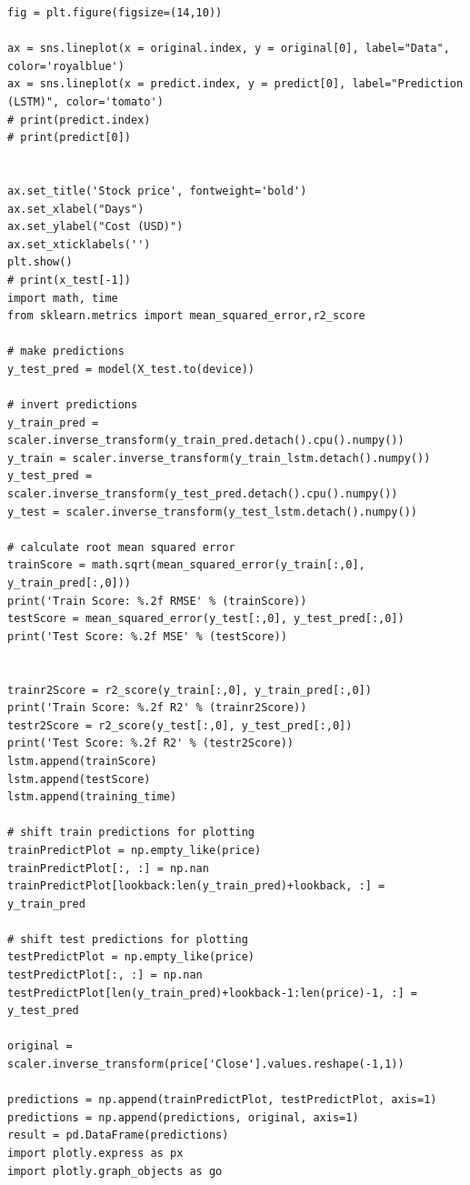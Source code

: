 \documentclass[stu,12pt,floatsintext]{apa7}
\begin{document}
\begin{verbatim}
fig = plt.figure(figsize=(14,10))

ax = sns.lineplot(x = original.index, y = original[0], label="Data", color='royalblue')
ax = sns.lineplot(x = predict.index, y = predict[0], label="Prediction (LSTM)", color='tomato')
# print(predict.index)
# print(predict[0])


ax.set_title('Stock price', fontweight='bold')
ax.set_xlabel("Days")
ax.set_ylabel("Cost (USD)")
ax.set_xticklabels('')
plt.show()
# print(x_test[-1])
import math, time
from sklearn.metrics import mean_squared_error,r2_score

# make predictions
y_test_pred = model(X_test.to(device))

# invert predictions
y_train_pred = scaler.inverse_transform(y_train_pred.detach().cpu().numpy())
y_train = scaler.inverse_transform(y_train_lstm.detach().numpy())
y_test_pred = scaler.inverse_transform(y_test_pred.detach().cpu().numpy())
y_test = scaler.inverse_transform(y_test_lstm.detach().numpy())

# calculate root mean squared error
trainScore = math.sqrt(mean_squared_error(y_train[:,0], y_train_pred[:,0]))
print('Train Score: %.2f RMSE' % (trainScore))
testScore = mean_squared_error(y_test[:,0], y_test_pred[:,0])
print('Test Score: %.2f MSE' % (testScore))


trainr2Score = r2_score(y_train[:,0], y_train_pred[:,0])
print('Train Score: %.2f R2' % (trainr2Score))
testr2Score = r2_score(y_test[:,0], y_test_pred[:,0])
print('Test Score: %.2f R2' % (testr2Score))
lstm.append(trainScore)
lstm.append(testScore)
lstm.append(training_time)

# shift train predictions for plotting
trainPredictPlot = np.empty_like(price)
trainPredictPlot[:, :] = np.nan
trainPredictPlot[lookback:len(y_train_pred)+lookback, :] = y_train_pred

# shift test predictions for plotting
testPredictPlot = np.empty_like(price)
testPredictPlot[:, :] = np.nan
testPredictPlot[len(y_train_pred)+lookback-1:len(price)-1, :] = y_test_pred

original = scaler.inverse_transform(price['Close'].values.reshape(-1,1))

predictions = np.append(trainPredictPlot, testPredictPlot, axis=1)
predictions = np.append(predictions, original, axis=1)
result = pd.DataFrame(predictions)
import plotly.express as px
import plotly.graph_objects as go


\end{verbatim}
\end{document}
